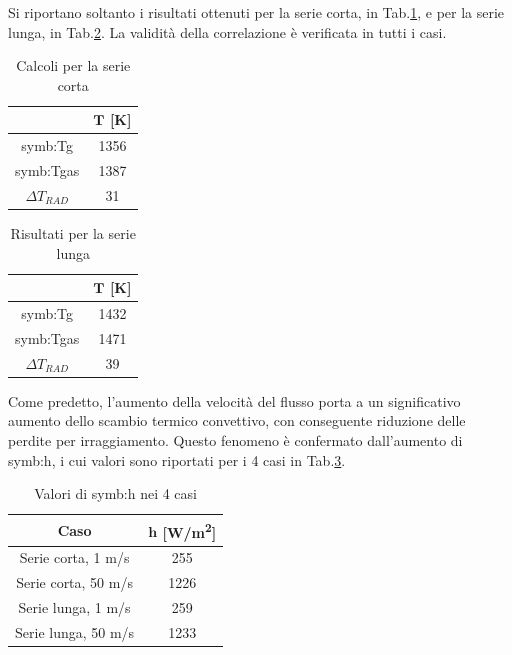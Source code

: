 Si riportano soltanto i risultati ottenuti per la serie corta, in Tab.\ref{tab:risultatishort50}, e per la serie lunga, in Tab.\ref{tab:risultatilong50}. La validità della correlazione è verificata in tutti i casi.  

\begin{table}[H]
	\centering
	\begin{tabular}{c|c}
		\toprule
		\toprule
		& $\bm{T}$ [K]\\
		\midrule
		\midrule
		\gls{symb:Tg} & 1356 \\
		\midrule
		\gls{symb:Tgas} & 1387 \\
		\midrule
		$\Delta T_{\textit{RAD}}$ & 31 \\
		\bottomrule
		\bottomrule	
	\end{tabular}
	\caption{Calcoli per la serie corta}
	\label{tab:risultatishort50}
\end{table}

\begin{table}[H]
	\centering
	\begin{tabular}{c|c}
		\toprule
		\toprule
		& $\bm{T}$ [K]\\
		\midrule
		\midrule
		\gls{symb:Tg} & 1432 \\
		\midrule
		\gls{symb:Tgas} & 1471 \\
		\midrule
		$\Delta T_{\textit{RAD}}$ & 39 \\
		\bottomrule
		\bottomrule	
	\end{tabular}
	\caption{Risultati per la serie lunga}
	\label{tab:risultatilong50}
\end{table}

Come predetto, l'aumento della velocità del flusso porta a un significativo aumento dello scambio termico convettivo, con conseguente riduzione delle perdite per irraggiamento. Questo fenomeno è confermato dall'aumento di \gls{symb:h}, i cui valori sono riportati per i 4 casi in Tab.\ref{tab:risultatih}.

\begin{table}[H]
	\centering
	\begin{tabular}{c|c}
		\toprule
		\toprule
		\textbf{Caso}& $\bm{h}$  [W/m\textsuperscript{2}] \\
		\midrule
		\midrule
		Serie corta, 1 m/s & 255 \\
		\midrule
		Serie corta, 50 m/s & 1226 \\
		\midrule
		Serie lunga, 1 m/s & 259 \\
		\midrule
		Serie lunga, 50 m/s & 1233 \\
		\bottomrule
		\bottomrule	
	\end{tabular}
	\caption{Valori di \gls{symb:h} nei 4 casi}
	\label{tab:risultatih}
\end{table}

